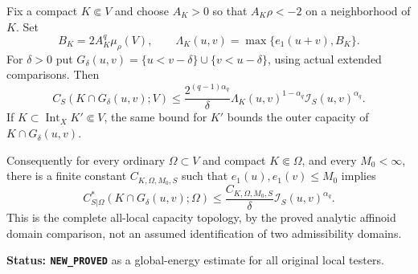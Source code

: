 \begin{theorem}
\label{thm:r11-first-energy-all-local-capacity}
Fix a compact $K\Subset V$ and choose $A_K>0$ so that
$A_K\rho<-2$ on a neighborhood of $K$. Set
\[
 B_K=2A_K^q\mu_\rho(V),\qquad
 \Lambda_K(u,v)=\max\{e_1(u+v),B_K\}.
 \tag{EV6}
\]
For $\delta>0$ put
$G_\delta(u,v)=\{u<v-\delta\}\cup\{v<u-\delta\}$,
using actual extended comparisons. Then
\[
 C_S(K\cap G_\delta(u,v);V)
    \leq\frac{2^{(q-1)\alpha_q}}\delta
          \Lambda_K(u,v)^{1-\alpha_q}
                      \mathscr I_S(u,v)^{\alpha_q}.
 \tag{EV7}
\]
If $K\subset\operatorname{Int}_X K'\Subset V$, the same
bound for $K'$ bounds the outer capacity of
$K\cap G_\delta(u,v)$.

Consequently for every ordinary $\Omega\subset V$ and
compact $K\Subset\Omega$, and every $M_0<\infty$, there
is a finite constant $C_{K,\Omega,M_0,S}$ such that
$e_1(u),e_1(v)\leq M_0$ implies
\[
 C_{S|\Omega}^*(K\cap G_\delta(u,v);\Omega)
       \leq\frac{C_{K,\Omega,M_0,S}}\delta
                            \mathscr I_S(u,v)^{\alpha_q}.
 \tag{EV8}
\]
This is the complete all-local capacity topology, by the
proved analytic affinoid domain comparison, not an assumed
identification of two admissibility domains.
\end{theorem}

\noindent\textbf{Status: \texttt{NEW\_PROVED}} as a
global-energy estimate for all original local testers.

